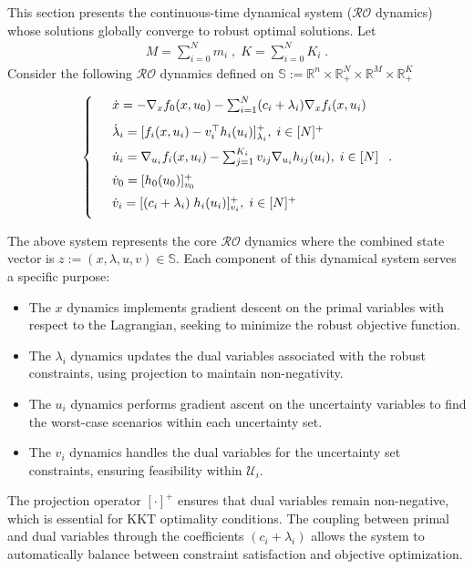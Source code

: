 \documentclass[journal,twoside,web]{ieeecolor}
\newcommand{\rev}[1]{\textcolor{revisionblue}{#1}}
\begin{document}
\rev{This section presents the continuous-time dynamical system ($\mathcal{RO}$ dynamics) whose solutions globally converge to robust optimal solutions.} Let
\begin{align*}
M=\sum_{i=0}^{N}m_i\;,\; K=\sum_{i=0}^{N}K_i\;.
\end{align*}
\rev{Consider the following $\mathcal{RO}$ dynamics defined on $\mathbb{S}:= \mathbb{R}^n \times \mathbb{R}^N_{+} \times \mathbb{R}^M \times \mathbb{R}^K_+$}\;

\begin{align} \label{pd_dynamics}
\left\{
\begin{array}{cl}
\vspace{3mm}
&\dot x=-\nabla_x f_0(x,u_0)-  \sum_{i=1}^N(c_i+\lambda_i) \nabla_x f_i(x,u_i)\\
\vspace{2mm}
&\dot \lambda_i=[f_i(x,u_i)-v_i^\top h_i(u_i)]_{\lambda_i}^+,\; i\in[N]^+\\
\vspace{2mm}
&\dot u_i=\nabla_{u_i}f_i(x,u_i)-  \sum_{j=1}^{K_i} v_{ij} \nabla_{u_i} h_{ij}(u_i),\; i\in[N]\\
\vspace{2mm}
&\dot{v}_0=[h_0(u_0)]_{v_0}^+\\
\vspace{2mm}
&\dot v_i=[(c_i+\lambda_i) \; h_i(u_i)]_{v_i}^+,\;i\in[N]^+
\end{array}\right..
\end{align}

\rev{The above system represents the core $\mathcal{RO}$ dynamics where the combined state vector is $z:=(x,\lambda,u,v) \in \mathbb{S}$. Each component of this dynamical system serves a specific purpose:

\begin{itemize}
\item The $x$ dynamics implements gradient descent on the primal variables with respect to the Lagrangian, seeking to minimize the robust objective function.
\item The $\lambda_i$ dynamics updates the dual variables associated with the robust constraints, using projection to maintain non-negativity.
\item The $u_i$ dynamics performs gradient ascent on the uncertainty variables to find the worst-case scenarios within each uncertainty set.
\item The $v_i$ dynamics handles the dual variables for the uncertainty set constraints, ensuring feasibility within $\mathcal{U}_i$.
\end{itemize}

The projection operator $[\cdot]^+$ ensures that dual variables remain non-negative, which is essential for KKT optimality conditions. The coupling between primal and dual variables through the coefficients $(c_i+\lambda_i)$ allows the system to automatically balance between constraint satisfaction and objective optimization.}
\end{document}
